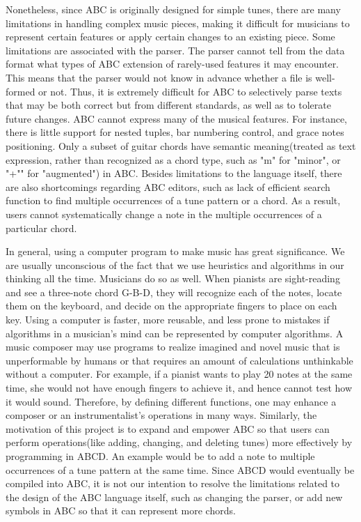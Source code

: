 Nonetheless, since ABC is originally designed for simple tunes, there are many limitations in handling complex music pieces, making it difficult for musicians to represent certain features or apply certain changes to an existing piece. Some limitations are associated with the parser. The parser cannot tell from the data format what types of ABC extension of rarely-used features it may encounter. This means that the parser would not know in advance whether a file is well-formed or not. Thus, it is extremely difficult for ABC to selectively parse texts that may be both correct but from different standards, as well as to tolerate future changes\cite{Cuthbert14}. ABC cannot express many of the musical features. For instance, there is little support for nested tuples, bar numbering control, and grace notes positioning\cite{Cuthbert14}. Only a subset of guitar chords have semantic meaning(treated as text expression, rather than recognized as a chord type, such as "m" for "minor", or "+"" for "augmented") in ABC\cite{Chambers02}. Besides limitations to the language itself, there are also shortcomings regarding ABC editors, such as lack of efficient search function to find multiple occurrences of a tune pattern or a chord. As a result, users cannot systematically change a note in the multiple occurrences of a particular chord. 

In general, using a computer program to make music has great significance. We are usually unconscious of the fact that we use heuristics and algorithms in our thinking all the time. Musicians do so as well. When pianists are sight-reading and see a three-note chord G-B-D, they will recognize each of the notes, locate them on the keyboard, and decide on the appropriate fingers to place on each key\cite{Dobrian88}.  Using a computer is faster, more reusable, and less prone to mistakes if  algorithms in a musician's mind can be represented by computer algorithms. A music composer may use programs to realize imagined and novel music that is unperformable by humans or that requires an amount of calculations unthinkable without a computer. For example, if a pianist wants to play 20 notes at the same time, she would not have enough fingers to achieve it, and hence cannot test how it would sound. Therefore, by defining different functions, one may enhance a composer or an instrumentalist's operations in many ways\cite{Dobrian88}. Similarly, the motivation of this project is to expand and empower ABC so that users can perform operations(like adding, changing, and deleting tunes) more effectively by programming in ABCD. An example would be to add a note to multiple occurrences of a tune pattern at the same time.  Since ABCD would eventually be compiled into ABC, it is not our intention to resolve the limitations related to the design of the ABC language itself, such as changing the parser, or add new symbols in ABC so that it can represent more chords.



